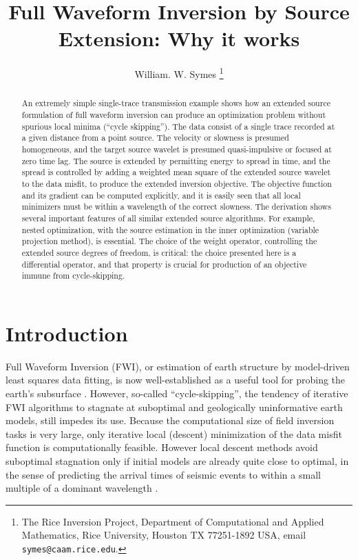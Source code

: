\title{Full Waveform Inversion by Source Extension: Why it works}
\author{William. W. Symes \thanks{The Rice Inversion Project,
Department of Computational and Applied Mathematics, Rice University,
Houston TX 77251-1892 USA, email {\tt symes@caam.rice.edu}.}}



\maketitle
\begin{abstract}
  An extremely simple single-trace transmission example shows how an
  extended source formulation of full waveform inversion can produce
  an optimization problem without spurious local minima (``cycle
  skipping''). The data consist of a single trace recorded at a given
  distance from a point source. The velocity or slowness is presumed
  homogeneous, and the target source wavelet is presumed
  quasi-impulsive or focused at zero time lag. The source is extended
  by permitting energy to spread in time, and the spread is controlled
  by adding a weighted mean square of the extended source wavelet to
  the data misfit, to produce the extended inversion objective. The
  objective function and its gradient can be computed explicitly, and
  it is easily seen that all local minimizers must be within a
  wavelength of the correct slowness. The derivation shows several
  important features of all similar extended source algorithms. For
  example, nested optimization, with the source estimation in the
  inner optimization (variable projection method), is essential. The
  choice of the weight operator, controlling the extended source
  degrees of freedom, is critical: the choice presented here is a
  differential operator, and that property is crucial for production
  of an objective immune from cycle-skipping.
\end{abstract}

\section{Introduction}
Full Waveform Inversion (FWI), or estimation of earth structure by
model-driven least squares data fitting, is now well-established as a
useful tool for probing the earth's subsurface
\cite[]{VirieuxOperto:09,Fichtner:10}. However, so-called ``cycle-skipping'', the tendency of iterative FWI
algorithms to stagnate at suboptimal and geologically uninformative
earth models, still impedes its use. Because the computational size of field inversion tasks
is very large, only iterative local (descent) minimization of the data
misfit function is computationally feasible. However local
descent methods avoid suboptimal stagnation only if initial models are
already quite close to optimal, in the sense of predicting the arrival
times of seismic events to within a small multiple of a dominant
wavelength \cite[]{GauTarVir:86,Plessix:10}.

